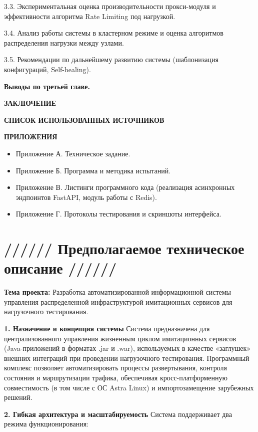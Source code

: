 \documentclass[
]{article}
\begin{document}
3.3. Экспериментальная оценка производительности прокси-модуля и
эффективности алгоритма Rate Limiting под нагрузкой.

3.4. Анализ работы системы в кластерном режиме и оценка алгоритмов
распределения нагрузки между узлами.

3.5. Рекомендации по дальнейшему развитию системы (шаблонизация
конфигураций, Self-healing).

\textbf{Выводы по третьей главе.}

\textbf{ЗАКЛЮЧЕНИЕ}

\textbf{СПИСОК ИСПОЛЬЗОВАННЫХ ИСТОЧНИКОВ}

\textbf{ПРИЛОЖЕНИЯ}

\begin{itemize}
\item
  Приложение А. Техническое задание.
\item
  Приложение Б. Программа и методика испытаний.
\item
  Приложение В. Листинги программного кода (реализация асинхронных
  эндпоинтов FastAPI, модуль работы с Redis).
\item
  Приложение Г. Протоколы тестирования и скриншоты интерфейса.
\end{itemize}

\section{////// Предполагаемое техническое описание
//////}\label{ux43fux440ux435ux434ux43fux43eux43bux430ux433ux430ux435ux43cux43eux435-ux442ux435ux445ux43dux438ux447ux435ux441ux43aux43eux435-ux43eux43fux438ux441ux430ux43dux438ux435}

\textbf{Тема проекта:} Разработка автоматизированной информационной
системы управления распределенной инфраструктурой имитационных сервисов
для нагрузочного тестирования.

\textbf{1. Назначение и концепция системы} Система предназначена для
централизованного управления жизненным циклом имитационных сервисов
(Java-приложений в форматах .jar и .war), используемых в качестве
«заглушек» внешних интеграций при проведении нагрузочного тестирования.
Программный комплекс позволяет автоматизировать процессы развертывания,
контроля состояния и маршрутизации трафика, обеспечивая
кросс-платформенную совместимость (в том числе с ОС Astra Linux) и
импортозамещение зарубежных решений.

\textbf{2. Гибкая архитектура и масштабируемость} Система поддерживает
два режима функционирования:
\end{document}
